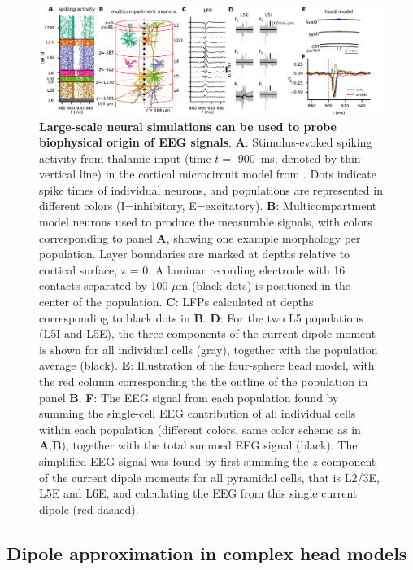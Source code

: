 \documentclass[preprint,10pt,authoryear]{elsarticle}
\begin{document}
\begin{figure}[H]
	\centering
	\includegraphics[width=1.0\textwidth]{hybrid_with_EEG}
	\caption{\textbf{Large-scale neural simulations can be used to probe biophysical origin of EEG signals}. 
		\textbf{A}: Stimulus-evoked spiking activity from thalamic input (time $t= $ 900~ms, denoted by thin vertical line) in the cortical microcircuit model from \cite{POTJANS2014}. Dots indicate spike times of individual neurons, and populations are represented in different colors (I=inhibitory, E=excitatory).
		\textbf{B}: Multicompartment model neurons used to produce the measurable signals, with colors corresponding to panel \textbf{A}, showing one example morphology per population. Layer boundaries are marked at depths relative to cortical surface, z = 0. A laminar recording electrode with 16 contacts separated by
		100 $\mu$m (black dots) is positioned in the center of the population.
		\textbf{C}: LFPs calculated at depths corresponding to black dots in \textbf{B}.
		\textbf{D}: For the two L5 populations (L5I and L5E), the three components of the current dipole moment is shown for all individual cells (gray), together with the population average (black).
		\textbf{E}: Illustration of the four-sphere head model, with the red column corresponding the the outline of the population in panel \textbf{B}.
		\textbf{F}: The EEG signal from each population found by summing the single-cell EEG contribution of all individual cells within each population (different colors, same color scheme as in \textbf{A},\textbf{B}), together with the total summed EEG signal (black). The simplified EEG signal was found by first summing the $z$-component of the current dipole moments for all pyramidal cells, that is L2/3E, L5E and L6E, and calculating the EEG from this single current dipole (red dashed).
	}
	\label{fig:population}
\end{figure}


\subsection{Dipole approximation in complex head models}
\end{document}
